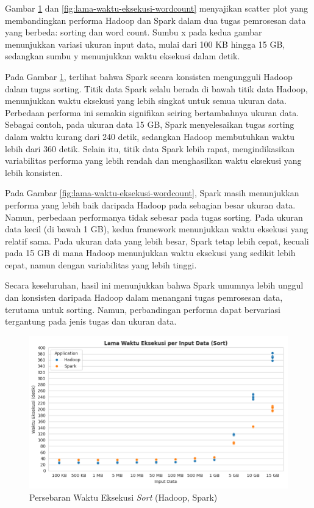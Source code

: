 Gambar \ref{fig:lama-waktu-eksekusi-sort} dan \ref{fig:lama-waktu-eksekusi-wordcount} menyajikan scatter plot yang membandingkan performa Hadoop dan Spark dalam dua tugas pemrosesan data yang berbeda: sorting dan word count.  Sumbu x pada kedua gambar menunjukkan variasi ukuran input data, mulai dari 100 KB hingga 15 GB, sedangkan sumbu y menunjukkan waktu eksekusi dalam detik.

Pada Gambar \ref{fig:lama-waktu-eksekusi-sort}, terlihat bahwa Spark secara konsisten mengungguli Hadoop dalam tugas sorting. Titik data Spark selalu berada di bawah titik data Hadoop, menunjukkan waktu eksekusi yang lebih singkat untuk semua ukuran data. Perbedaan performa ini semakin signifikan seiring bertambahnya ukuran data. Sebagai contoh, pada ukuran data 15 GB, Spark menyelesaikan tugas sorting dalam waktu kurang dari 240 detik, sedangkan Hadoop membutuhkan waktu lebih dari 360 detik. Selain itu, titik data Spark lebih rapat, mengindikasikan variabilitas performa yang lebih rendah dan menghasilkan waktu eksekusi yang lebih konsisten.

Pada Gambar \ref{fig:lama-waktu-eksekusi-wordcount}, Spark masih menunjukkan performa yang lebih baik daripada Hadoop pada sebagian besar ukuran data. Namun, perbedaan performanya tidak sebesar pada tugas sorting. Pada ukuran data kecil (di bawah 1 GB), kedua framework menunjukkan waktu eksekusi yang relatif sama. Pada ukuran data yang lebih besar, Spark tetap lebih cepat, kecuali pada 15 GB di mana Hadoop menunjukkan waktu eksekusi yang sedikit lebih cepat, namun dengan variabilitas yang lebih tinggi. 

Secara keseluruhan, hasil ini menunjukkan bahwa Spark umumnya lebih unggul dan konsisten daripada Hadoop dalam menangani tugas pemrosesan data, terutama untuk sorting. Namun, perbandingan performa dapat bervariasi tergantung pada jenis tugas dan ukuran data.

\begin{figure}[h]
    \centering
    \includegraphics[width=1\textwidth]{figures/ch04/1-lama-waktu-eksekusi-sort.png}
    \caption{Persebaran Waktu Eksekusi \textit{Sort} (Hadoop, Spark)}
    \label{fig:lama-waktu-eksekusi-sort}
\end{figure}


